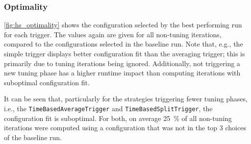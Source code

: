 \subsubsection{Optimality}
\autoref{fig:hs_optimality} shows the configuration selected by the best performing run for each trigger. The values again are given for all non-tuning iterations, compared to the configurations selected in the baseline run. Note that, e.g., the simple trigger displays better configuration fit than the averaging trigger; this is primarily due to tuning iterations being ignored. Additionally, not triggering a new tuning phase has a higher runtime impact than computing iterations with suboptimal configuration fit.

It can be seen that, particularly for the strategies triggering fewer tuning phases, i.e., the \texttt{TimeBasedAverageTrigger} and \texttt{TimeBasedSplitTrigger}, the configuration fit is suboptimal. For both, on average \qty{25}{\percent} of all non-tuning iterations were computed using a configuration that was not in the top 3 choices of the baseline run.

